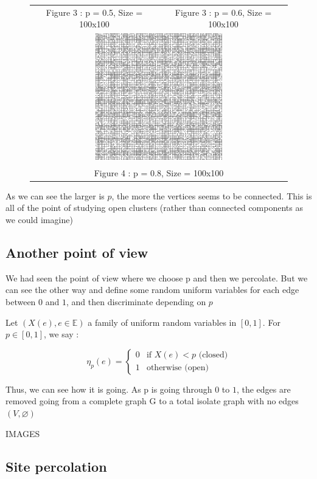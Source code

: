 \documentclass{article}
\begin{document}
\begin{figure}
\begin{tabular}{cc}
Figure 3 : p = 0.5, Size = 100x100 & Figure 3 : p = 0.6, Size = 100x100 \\[6pt]
\multicolumn{2}{c}{\includegraphics[width=55mm]{perc_80_1} }\\
\multicolumn{2}{c}{Figure 4 : p = 0.8, Size = 100x100}
\end{tabular}
\end{figure}

As we can see the larger is $p$, the more the vertices seems to be connected.
This is all of the point of studying open clusters (rather than connected components as we could imagine)

\subsection{Another point of view}
We had seen the point of view where we choose p and then we percolate. But we can see the other way and define some random uniform variables for each edge between $0$ and $1$, and then discriminate depending on $p$

Let $(X(e), e\in\mathbb{E})$ a family of uniform random variables in $[0,1]$. For $p \in [0,1]$, we say :

$$
\eta_p(e) = \left\{
    \begin{array}{ll}
        0 & \mbox{if $X(e) < p$ (closed)}\\
        1 & \mbox{otherwise (open)}
    \end{array}
\right.
$$

Thus, we can see how it is going. As p is going through $0$ to $1$, the edges are removed going from a complete graph G to a total isolate graph with no edges $(V, \varnothing)$

IMAGES

\subsection{Site percolation}
\end{document}

